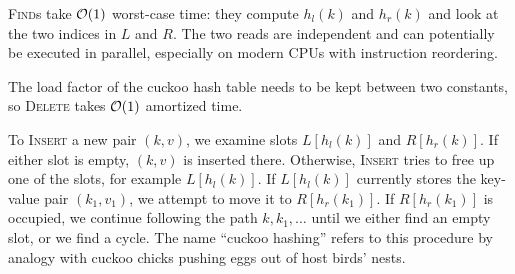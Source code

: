 \textsc{Find}s take $\mathcal{O}(1)$ worst-case time: they compute $h_l(k)$ and $h_r(k)$
and look at the two indices in $L$ and $R$. The two reads are independent and
can potentially be executed in parallel, especially on modern CPUs with
instruction reordering.

The load factor of the cuckoo hash table needs to be kept between two
constants, so \textsc{Delete} takes $\mathcal{O}(1)$ amortized time.

To \textsc{Insert} a new pair $(k,v)$, we examine slots $L[h_l(k)]$ and
$R[h_r(k)]$. If either slot is empty, $(k,v)$ is inserted there. Otherwise,
\textsc{Insert} tries to free up one of the slots, for example $L[h_l(k)]$.
If $L[h_l(k)]$ currently stores the key-value pair $(k_1,v_1)$, we attempt to
move it to $R[h_r(k_1)]$. If $R[h_r(k_1)]$ is occupied, we continue following
the path $k,k_1,\ldots$ until we either find an empty slot, or we find a cycle.
The name ``cuckoo hashing'' refers to this procedure by analogy with
cuckoo chicks pushing eggs out of host birds' nests.

